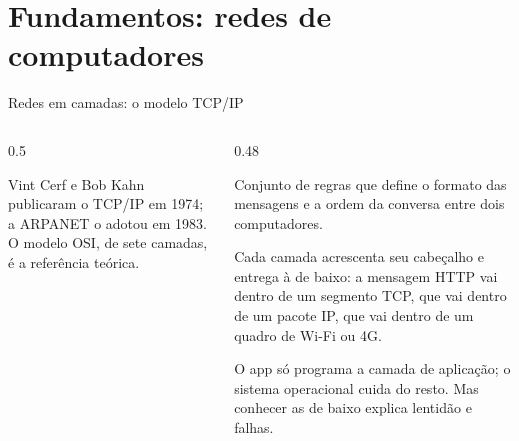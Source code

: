 \section{Fundamentos: redes de computadores}

\begin{frame}{Redes em camadas: o modelo TCP/IP}
  \begin{columns}[c]
    \begin{column}{0.5\textwidth}
      \centering
      \begin{historia}
        Vint Cerf e Bob Kahn publicaram o TCP/IP em 1974; a ARPANET o adotou em 1983. O modelo OSI, de sete camadas, é a referência teórica.
      \end{historia}
    \end{column}
    \begin{column}{0.48\textwidth}
      \begin{definicao}[Protocolo]
        Conjunto de regras que define o formato das mensagens e a ordem da conversa entre dois computadores.
      \end{definicao}
      \begin{conceito}[Encapsulamento]
        Cada camada acrescenta seu cabeçalho e entrega à de baixo: a mensagem HTTP vai dentro de um segmento TCP, que vai dentro de um pacote IP, que vai dentro de um quadro de Wi-Fi ou 4G.
      \end{conceito}
      \begin{dica}
        O app só programa a camada de aplicação; o sistema operacional cuida do resto. Mas conhecer as de baixo explica lentidão e falhas.
      \end{dica}
    \end{column}
  \end{columns}
\end{frame}

